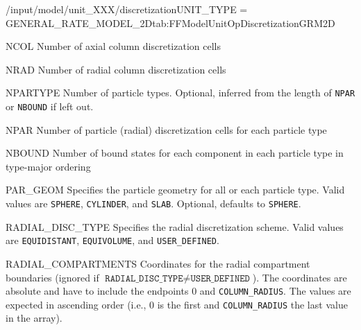 \begin{condsubgroup}{/input/model/unit\_XXX/discretization}{UNIT\_TYPE = GENERAL\_RATE\_MODEL\_2D}{tab:FFModelUnitOpDiscretizationGRM2D}
  \begin{dataset}[type=int,range={$\geq 1$},length=1]{NCOL}
    Number of axial column discretization cells
  \end{dataset}
  \begin{dataset}[type=int,range={$\geq 1$},length=1]{NRAD}
    Number of radial column discretization cells
  \end{dataset}
  \begin{dataset}[type=int,range={$\geq 1$},length=1]{NPARTYPE}
    Number of particle types.
    Optional, inferred from the length of \texttt{NPAR} or \texttt{NBOUND} if left out.
  \end{dataset}
  \begin{dataset}[type=int,range={$\geq 1$},length={$1$ / \texttt{NPARTYPE}}]{NPAR}
    Number of particle (radial) discretization cells for each particle type
  \end{dataset}
  \begin{dataset}[type=int,range={$\geq 0$},length={\texttt{NCOMP} / $\texttt{NPARTYPE} \cdot \texttt{NCOMP}$}]{NBOUND}
    Number of bound states for each component in each particle type in type-major ordering
  \end{dataset}
  \begin{dataset}[type=string,range={$\{ \texttt{SPHERE}, \texttt{CYLINDER}, \texttt{SLAB} \}$},length={$1$ / \texttt{NPARTYPE}}]{PAR\_GEOM}
    Specifies the particle geometry for all or each particle type.
    Valid values are \texttt{SPHERE}, \texttt{CYLINDER}, and \texttt{SLAB}.
    Optional, defaults to \texttt{SPHERE}.
  \end{dataset}
  \begin{dataset}[type=string,length=1]{RADIAL\_DISC\_TYPE}
    Specifies the radial discretization scheme.
    Valid values are \texttt{EQUIDISTANT}, \texttt{EQUIVOLUME}, and \texttt{USER\_DEFINED}.
  \end{dataset}
  \begin{dataset}[unit=\si{\metre},type=double,range={$[0,\texttt{COLUMN\_RADIUS}]$},length={$\texttt{NRAD} + 1$}]{RADIAL\_COMPARTMENTS}
    Coordinates for the radial compartment boundaries (ignored if $\texttt{RADIAL\_DISC\_TYPE} \neq \texttt{USER\_DEFINED}$).
    The coordinates are absolute and have to include the endpoints $0$ and \texttt{COLUMN\_RADIUS}.
    The values are expected in ascending order (i.e., $0$ is the first and \texttt{COLUMN\_RADIUS} the last value in the array).

\end{dataset}
\end{condsubgroup}
